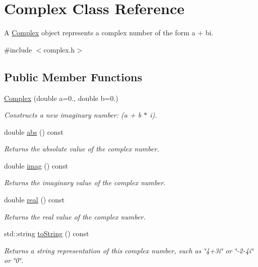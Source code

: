 \hypertarget{classComplex}{}\section{Complex Class Reference}
\label{classComplex}


A \mbox{\hyperlink{classComplex}{Complex}} object represents a complex number of the form a + bi.  




{\ttfamily \#include $<$complex.\+h$>$}

\subsection*{Public Member Functions}
\begin{DoxyCompactItemize}
\item 
\mbox{\hyperlink{classComplex_a900a80f2ea5c0c3dc9393402b6ce8df3}{Complex}} (double a=0., double b=0.)
\begin{DoxyCompactList}\small\item\em Constructs a new imaginary number\+: (a + b $\ast$ i). \end{DoxyCompactList}\item 
double \mbox{\hyperlink{classComplex_ad534b137e1216937005dd363a5579ed0}{abs}} () const
\begin{DoxyCompactList}\small\item\em Returns the absolute value of the complex number. \end{DoxyCompactList}\item 
double \mbox{\hyperlink{classComplex_ac6d0f1ec6a24b5904bc3a206b3c117ff}{imag}} () const
\begin{DoxyCompactList}\small\item\em Returns the imaginary value of the complex number. \end{DoxyCompactList}\item 
double \mbox{\hyperlink{classComplex_a3a3f678878dde3a729f94dfefbdc4ef2}{real}} () const
\begin{DoxyCompactList}\small\item\em Returns the real value of the complex number. \end{DoxyCompactList}\item 
std\+::string \mbox{\hyperlink{classComplex_a1fe5121d6528fdea3f243321b3fa3a49}{to\+String}} () const
\begin{DoxyCompactList}\small\item\em Returns a string representation of this complex number, such as \char`\"{}4+3i\char`\"{} or \char`\"{}-\/2-\/4i\char`\"{} or \char`\"{}0\char`\"{}. \end{DoxyCompactList}\end{DoxyCompactItemize}


